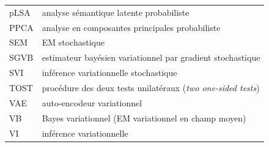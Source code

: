 \begin{tabular}{@{}ll@{}}
pLSA & analyse sémantique latente probabiliste \\
PPCA & analyse en composantes principales probabiliste \\
SEM & EM stochastique \\
SGVB & estimateur bayésien variationnel par gradient stochastique \\
SVI & inférence variationnelle stochastique \\
TOST & procédure des deux tests unilatéraux (\emph{two one-sided tests}) \\
VAE & auto-encodeur variationnel \\
VB & Bayes variationnel (EM variationnel en champ moyen) \\
VI & inférence variationnelle \\
\end{tabular}

